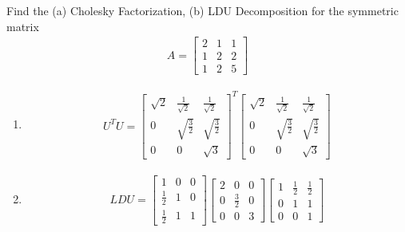 \begin{Exercise}
Find the (a) Cholesky Factorization, (b) LDU Decomposition for the symmetric matrix
\begin{align*}
A = 
\begin{bmatrix}
2 & 1 & 1 \\
1 & 2 & 2 \\
1 & 2 & 5
\end{bmatrix}
\end{align*}
\end{Exercise}
\begin{Answer}
\begin{enumerate}[label=(\alph*)]
\item 
\begin{align*}
U^TU =
\begin{bmatrix}
\sqrt{2} & \frac{1}{\sqrt{2}} & \frac{1}{\sqrt{2}} \\
0 & \sqrt{\frac{3}{2}} & \sqrt{\frac{3}{2}} \\
0 & 0 & \sqrt{3}
\end{bmatrix}^T
\begin{bmatrix}
\sqrt{2} & \frac{1}{\sqrt{2}} & \frac{1}{\sqrt{2}} \\
0 & \sqrt{\frac{3}{2}} & \sqrt{\frac{3}{2}} \\
0 & 0 & \sqrt{3}
\end{bmatrix}
\end{align*}
\item 
\begin{align*}
LDU =  
\begin{bmatrix}
1&0&0\\ 
\frac{1}{2}&1&0\\ 
\frac{1}{2}&1&1
\end{bmatrix}
\begin{bmatrix}
2 & 0 & 0 \\
0 & \frac{3}{2} & 0 \\
0 & 0 & 3
\end{bmatrix}
\begin{bmatrix}
1&\frac{1}{2}&\frac{1}{2}\\ 
0&1&1\\ 
0&0&1
\end{bmatrix}
\end{align*}
\end{enumerate}
\end{Answer}

